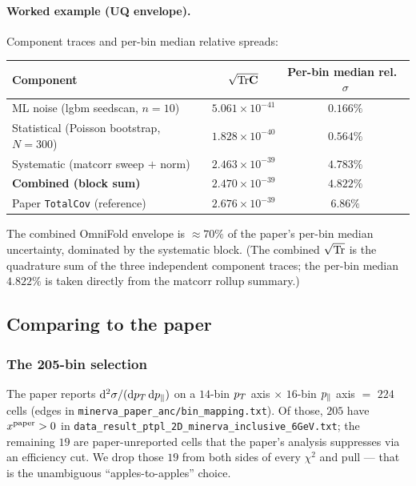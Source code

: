 \paragraph{Worked example (UQ envelope).}
Component traces and per-bin median relative spreads:
\begin{center}
\begin{tabular}{@{}lcc@{}}
\toprule
Component & $\sqrt{\mathrm{Tr}\mathbf{C}}$ & Per-bin median rel.\ $\sigma$ \\
\midrule
ML noise (lgbm seedscan, $n=10$) & $5.061\times10^{-41}$ & $0.166\%$ \\
Statistical (Poisson bootstrap, $N=300$) & $1.828\times10^{-40}$ & $0.564\%$ \\
Systematic (matcorr sweep $+$ norm) & $2.463\times10^{-39}$ & $4.783\%$ \\
\midrule
\textbf{Combined (block sum)} & $2.470\times10^{-39}$ & $\boxed{4.822\%}$ \\
Paper \texttt{TotalCov} (reference) & $2.676\times10^{-39}$ & $6.86\%$ \\
\bottomrule
\end{tabular}
\end{center}
The combined OmniFold envelope is $\approx 70\%$ of the paper's per-bin
median uncertainty, dominated by the systematic block. (The combined
$\sqrt{\mathrm{Tr}}$ is the quadrature sum of the three independent component
traces; the per-bin median $4.822\%$ is taken directly from the
matcorr rollup summary.)

\subsection{Comparing to the paper}
\label{sec:compare}

\subsubsection{The 205-bin selection}
\label{sec:205bins}

The paper reports $\mathrm{d}^{2}\sigma/(\mathrm{d}p_{T}\,\mathrm{d}p_{\parallel})$
on a $14$-bin $p_{T}$ axis $\times$ $16$-bin $p_{\parallel}$ axis $=$ $224$
cells (edges in
\texttt{minerva\_paper\_anc/bin\_mapping.txt}). Of those, $205$ have
$x^{\text{paper}}>0$ in
\texttt{data\_result\_ptpl\_2D\_minerva\_inclusive\_6GeV.txt}; the
remaining $19$ are paper-unreported cells that the paper's analysis
suppresses via an efficiency cut. We drop those $19$ from both sides
of every $\chi^{2}$ and pull --- that is the unambiguous
``apples-to-apples'' choice.

